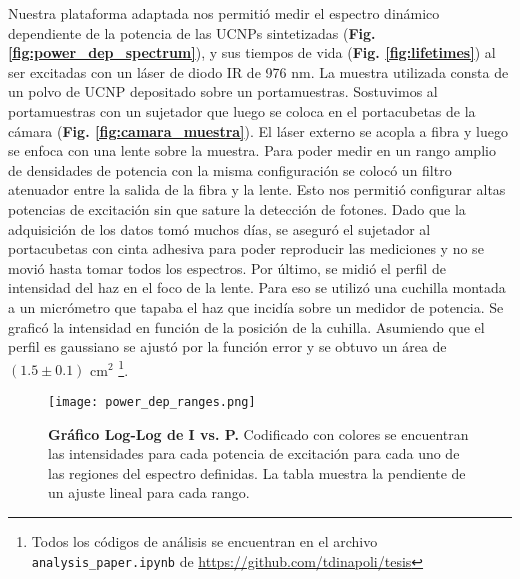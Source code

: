 Nuestra plataforma adaptada nos permitió medir el espectro dinámico dependiente de la potencia de las UCNPs sintetizadas (\textbf{Fig. \ref{fig:power_dep_spectrum}}), y sus tiempos de vida (\textbf{Fig. \ref{fig:lifetimes}}) al ser excitadas con un láser de diodo IR de 976 nm.  
La muestra utilizada consta de un polvo de UCNP depositado sobre un portamuestras.
Sostuvimos al portamuestras con un sujetador que luego se coloca en el portacubetas de la cámara (\textbf{Fig. \ref{fig:camara_muestra}}).
El láser externo se acopla a fibra y luego se enfoca con una lente sobre la muestra.
Para poder medir en un rango amplio de densidades de potencia con la misma configuración se colocó un filtro atenuador entre la salida de la fibra y la lente.
Esto nos permitió configurar altas potencias de excitación sin que sature la detección de fotones.
Dado que la adquisición de los datos tomó muchos días, se aseguró el sujetador al portacubetas con cinta adhesiva para poder reproducir las mediciones y no se movió hasta tomar todos los espectros.
Por último, se midió el perfil de intensidad del haz en el foco de la lente.
Para eso se utilizó una cuchilla montada a un micrómetro que tapaba el haz que incidía sobre un medidor de potencia.
Se graficó la intensidad en función de la posición de la cuhilla.
Asumiendo que el perfil es gaussiano se ajustó por la función error y se obtuvo un área de $(1.5 \pm 0.1)$ cm$^2$ \footnote{Todos los códigos de análisis se encuentran en el archivo \texttt{analysis\_paper.ipynb} de \href{https://github.com/tdinapoli/tesis}{https://github.com/tdinapoli/tesis}}.

\begin{figure}
    \centering
    \texttt{[image: power\_dep\_ranges.png]}
    \caption{\textbf{Gráfico Log-Log de I vs. P.} Codificado con colores se encuentran las intensidades para cada potencia de excitación para cada uno de las regiones del espectro definidas. La tabla muestra la pendiente de un ajuste lineal para cada rango.}
    \label{fig:power_dep_ranges}
\end{figure}

